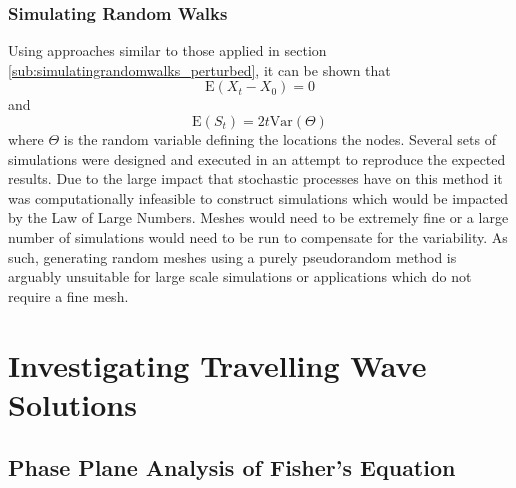 \documentclass[11pt,titlepage,a4paper]{article}
\begin{document}
		\subsubsection{Simulating Random Walks}
		\label{sub:simulatingrandomwalks_random}
			
			Using approaches similar to those applied in section \ref{sub:simulatingrandomwalks_perturbed}, it can be shown that
			\begin{equation*}
				\mathrm{E} \left(X_t - X_0 \right) = 0
			\end{equation*}
			and 
			\begin{equation*}
				\mathrm{E} \left(S_t \right) = 2 t \mathrm{Var} \left(\Theta \right)
			\end{equation*}
			where $\Theta$ is the random variable defining the locations the nodes. Several sets of simulations were designed and executed in an attempt to reproduce the expected results. Due to the large impact that stochastic processes have on this method it was computationally infeasible to construct simulations which would be impacted by the Law of Large Numbers. Meshes would need to be extremely fine or a large number of simulations would need to be run to compensate for the variability. As such, generating random meshes using a purely pseudorandom method is arguably unsuitable for large scale simulations or applications which do not require a fine mesh. 
		
	


\section{Investigating Travelling Wave Solutions}
	\label{sec:investigatingfishersequation}
	
	\subsection{Phase Plane Analysis of Fisher's Equation}
		\label{sub:phaseplaneanalysisoffishersequation}
		
\end{document}
